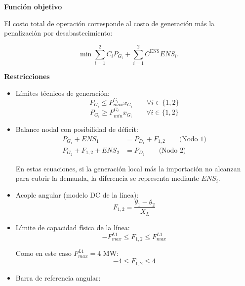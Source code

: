 \begin{enumerate}
\textbf{Función objetivo}

El costo total de operación corresponde al costo de generación más la penalización por desabastecimiento:

\begin{equation}
    \min \sum_{i=1}^{2} C_i P_{G_i} + \sum_{i=1}^{2} C^{\text{ENS}} ENS_i.
\end{equation}

\textbf{Restricciones}

\begin{itemize}
    \item Límites técnicos de generación:
    \begin{equation}
        P_{G_i} \leq P_{max}^{G_i}x_{G_i}
        \qquad \forall i\in\{1,2\}
    \end{equation}
    \begin{equation}
        P_{G_i} \geq P_{min}^{G_i}x_{G_i}
        \qquad \forall i\in\{1,2\}
    \end{equation}

    \item Balance nodal con posibilidad de déficit:
    \begin{align}
        P_{G_1} + ENS_1 &= P_{D_1} + F_{1,2}
        \qquad \text{(Nodo 1)} \\
        P_{G_2} + F_{1,2} + ENS_2 &= P_{D_2}
        \qquad \text{(Nodo 2)}
    \end{align}

    En estas ecuaciones, si la generación local más la importación no alcanzan para cubrir la demanda, la diferencia se representa mediante $ENS_i$.

    \item Acople angular (modelo DC de la línea):
    \begin{equation}
        F_{1,2} = \frac{\theta_1-\theta_2}{X_L}
    \end{equation}

    \item Límite de capacidad física de la línea:
    \begin{equation}
        -F_{max}^{L1} \leq F_{1,2} \leq F_{max}^{L1}
    \end{equation}

    Como en este caso $F_{max}^{L1}=4$ MW:
    \begin{equation}
        -4 \leq F_{1,2} \leq 4
    \end{equation}

    \item Barra de referencia angular:


\end{itemize}
\end{enumerate}
